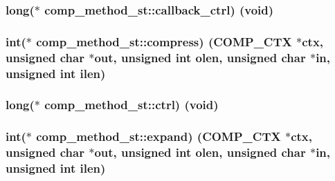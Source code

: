 \subsubsection[{\texorpdfstring{callback\+\_\+ctrl}{callback_ctrl}}]{\setlength{\rightskip}{0pt plus 5cm}long($\ast$ comp\+\_\+method\+\_\+st\+::callback\+\_\+ctrl) (void)}\hypertarget{structcomp__method__st_a56f1252386d5b98a5560b1ada313ce09}{}\label{structcomp__method__st_a56f1252386d5b98a5560b1ada313ce09}
\subsubsection[{\texorpdfstring{compress}{compress}}]{\setlength{\rightskip}{0pt plus 5cm}int($\ast$ comp\+\_\+method\+\_\+st\+::compress) ({\bf C\+O\+M\+P\+\_\+\+C\+TX} $\ast$ctx, unsigned char $\ast$out, unsigned int olen, unsigned char $\ast$in, unsigned int ilen)}\hypertarget{structcomp__method__st_ad894ddf63c5ec8904fc9ea47d138fbac}{}\label{structcomp__method__st_ad894ddf63c5ec8904fc9ea47d138fbac}
\subsubsection[{\texorpdfstring{ctrl}{ctrl}}]{\setlength{\rightskip}{0pt plus 5cm}long($\ast$ comp\+\_\+method\+\_\+st\+::ctrl) (void)}\hypertarget{structcomp__method__st_a1759ea60f1c12ec6d9489855b78b1463}{}\label{structcomp__method__st_a1759ea60f1c12ec6d9489855b78b1463}
\subsubsection[{\texorpdfstring{expand}{expand}}]{\setlength{\rightskip}{0pt plus 5cm}int($\ast$ comp\+\_\+method\+\_\+st\+::expand) ({\bf C\+O\+M\+P\+\_\+\+C\+TX} $\ast$ctx, unsigned char $\ast$out, unsigned int olen, unsigned char $\ast$in, unsigned int ilen)}\hypertarget{structcomp__method__st_a553b3c0860205e265266e958eba563af}{}\label{structcomp__method__st_a553b3c0860205e265266e958eba563af}
